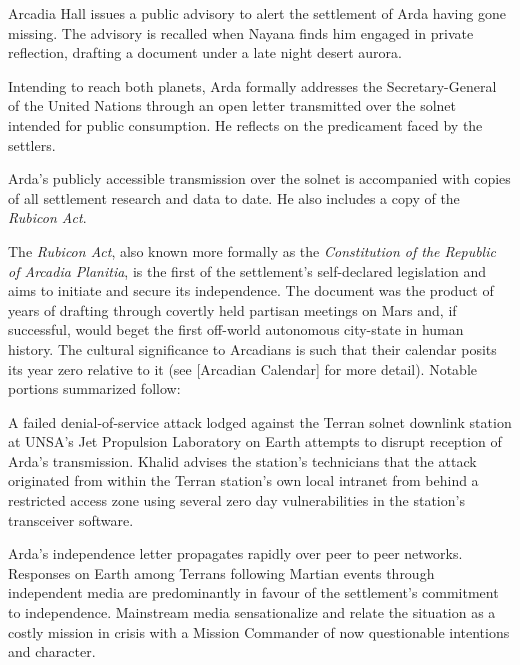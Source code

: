 Arcadia Hall issues a public advisory to alert the settlement of Arda having gone missing. The advisory is recalled when Nayana finds him engaged in private reflection, drafting a document under a late night desert aurora.
\StopTimelineDate


Intending to reach both planets, Arda formally addresses the Secretary-General of the United Nations through an open letter transmitted over the solnet intended for public consumption. He reflects on the predicament faced by the settlers.

\startTimelineCorrespondenceDocument
    
\stopTimelineCorrespondenceDocument

Arda's publicly accessible transmission over the solnet is accompanied with copies of all settlement research and data to date. He also includes a copy of the {\it Rubicon Act}. 

The {\it Rubicon Act}, also known more formally as the {\it Constitution of the Republic of Arcadia Planitia}, is the first of the settlement's self-declared legislation and aims to initiate and secure its independence. The document was the product of years of drafting through covertly held partisan meetings on Mars and, if successful, would beget the first off-world autonomous city-state in human history. The cultural significance to Arcadians is such that their calendar posits its year zero relative to it (see [Arcadian Calendar] for more detail). Notable portions summarized follow:

\startTimelineGeneralDocument
    
\stopTimelineGeneralDocument

A failed denial-of-service attack lodged against the Terran solnet downlink station at UNSA's Jet Propulsion Laboratory on Earth attempts to disrupt reception of Arda's transmission. Khalid advises the station's technicians that the attack originated from within the Terran station's own local intranet from behind a restricted access zone using several zero day vulnerabilities in the station's transceiver software.

Arda's independence letter propagates rapidly over peer to peer networks. Responses on Earth among Terrans following Martian events through independent media are predominantly in favour of the settlement's commitment to independence. Mainstream media sensationalize and relate the situation as a costly mission in crisis with a Mission Commander of now questionable intentions and character.
\StopTimelineDate

